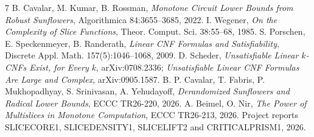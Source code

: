 \documentclass[11pt]{article}
\begin{document}
\begin{thebibliography}{7}
 B. Cavalar, M. Kumar, B. Rossman, \emph{Monotone Circuit Lower Bounds from Robust Sunflowers}, Algorithmica 84:3655--3685, 2022.
 I. Wegener, \emph{On the Complexity of Slice Functions}, Theor. Comput. Sci. 38:55--68, 1985.
 S. Porschen, E. Speckenmeyer, B. Randerath, \emph{Linear CNF Formulas and Satisfiability}, Discrete Appl. Math. 157(5):1046--1068, 2009.
 D. Scheder, \emph{Unsatisfiable Linear $k$-CNFs Exist, for Every $k$}, arXiv:0708.2336; \emph{Unsatisfiable Linear CNF Formulas Are Large and Complex}, arXiv:0905.1587.
 B. P. Cavalar, T. Fabris, P. Mukhopadhyay, S. Srinivasan, A. Yehudayoff, \emph{Derandomized Sunflowers and Radical Lower Bounds}, ECCC TR26-220, 2026.
 A. Beimel, O. Nir, \emph{The Power of Multislices in Monotone Computation}, ECCC TR26-213, 2026.
 Project reports SLICECORE1, SLICEDENSITY1, SLICELIFT2 and CRITICALPRISM1, 2026.
\end{thebibliography}
\end{document}

